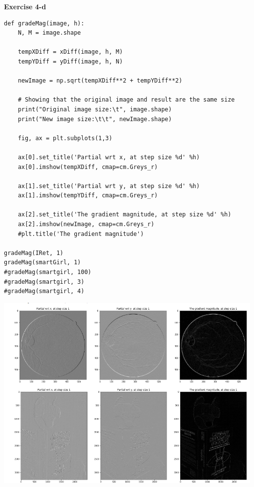\textbf{Exercise 4-d}
\begin{verbatim}
def gradeMag(image, h):
    N, M = image.shape

    tempXDiff = xDiff(image, h, M)
    tempYDiff = yDiff(image, h, N)
    
    newImage = np.sqrt(tempXDiff**2 + tempYDiff**2)

    # Showing that the original image and result are the same size
    print("Original image size:\t", image.shape)
    print("New image size:\t\t", newImage.shape)
    
    fig, ax = plt.subplots(1,3)
    
    ax[0].set_title('Partial wrt x, at step size %d' %h)
    ax[0].imshow(tempXDiff, cmap=cm.Greys_r)
    
    ax[1].set_title('Partial wrt y, at step size %d' %h)
    ax[1].imshow(tempYDiff, cmap=cm.Greys_r)
    
    ax[2].set_title('The gradient magnitude, at step size %d' %h)
    ax[2].imshow(newImage, cmap=cm.Greys_r)
    #plt.title('The gradient magnitude')

gradeMag(IRet, 1)
gradeMag(smartGirl, 1)
#gradeMag(smartgirl, 100)
#gradeMag(smartgirl, 3)
#gradeMag(smartgirl, 4)
\end{verbatim}

\includegraphics[width=\linewidth]{masd1409184b.png}